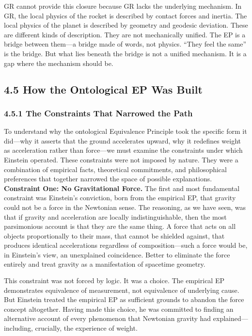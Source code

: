 \documentclass[11pt]{article}
\begin{document}
GR cannot provide this closure because GR lacks the underlying mechanism. In GR, the local physics of the rocket is described by contact forces and inertia. The local physics of the planet is described by geometry and geodesic deviation. These are different kinds of description. They are not mechanically unified. The EP is a bridge between them---a bridge made of words, not physics. ``They feel the same'' is the bridge. But what lies beneath the bridge is not a unified mechanism. It is a gap where the mechanism should be.

\subsection{4.5 How the Ontological EP Was Built}

\subsubsection{4.5.1 The Constraints That Narrowed the Path}

To understand why the ontological Equivalence Principle took the specific form it did---why it asserts that the ground accelerates upward, why it redefines weight as acceleration rather than force---we must examine the constraints under which Einstein operated. These constraints were not imposed by nature. They were a combination of empirical facts, theoretical commitments, and philosophical preferences that together narrowed the space of possible explanations. \textbf{Constraint One: No Gravitational Force.} The first and most fundamental constraint was Einstein's conviction, born from the empirical EP, that gravity could not be a force in the Newtonian sense. The reasoning, as we have seen, was that if gravity and acceleration are locally indistinguishable, then the most parsimonious account is that they are the same thing. A force that acts on all objects proportionally to their mass, that cannot be shielded against, that produces identical accelerations regardless of composition---such a force would be, in Einstein's view, an unexplained coincidence. Better to eliminate the force entirely and treat gravity as a manifestation of spacetime geometry.

This constraint was not forced by logic. It was a choice. The empirical EP demonstrates equivalence of measurement, not equivalence of underlying cause. But Einstein treated the empirical EP as sufficient grounds to abandon the force concept altogether. Having made this choice, he was committed to finding an alternative account of every phenomenon that Newtonian gravity had explained---including, crucially, the experience of weight.
\end{document}
